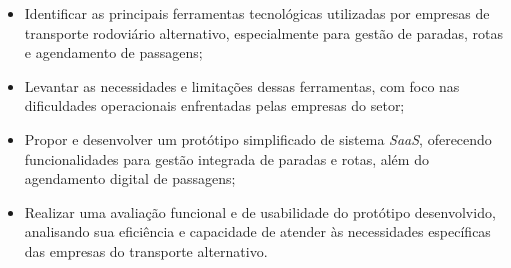 \begin{itemize}
    \item Identificar as principais ferramentas tecnológicas utilizadas por empresas de transporte rodoviário alternativo, especialmente para gestão de paradas, rotas e agendamento de passagens;

    \item Levantar as necessidades e limitações dessas ferramentas, com foco nas dificuldades operacionais enfrentadas pelas empresas do setor;

    \item Propor e desenvolver um protótipo simplificado de sistema \textit{SaaS}, oferecendo funcionalidades para gestão integrada de paradas e rotas, além do agendamento digital de passagens;

    \item Realizar uma avaliação funcional e de usabilidade do protótipo desenvolvido, analisando sua eficiência e capacidade de atender às necessidades específicas das empresas do transporte alternativo.
\end{itemize}
